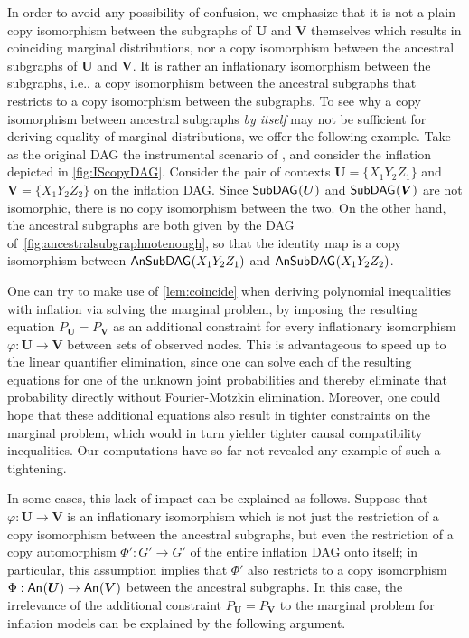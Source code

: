 \documentclass[aps,english,superscriptaddress,onecolumn,twoside,longbibliography,pra,floatfix,fleqn,nofootinbib]{revtex4-1}%
\theoremstyle{definition}
\newcounter{example}[section]
\newcommand{\An}[2][]{{\mathsf{An}_{#1}}\parenths{#2}}
\newcommand{\SmallNamedFunction}[3][]{\operatorname{\mathsf{#2}}_{#1}\parenths{#3}}
\newcommand{\subgraph}[2][]{\SmallNamedFunction[#1]{SubDAG}{#2}}
\newcommand{\ansubgraph}[2][]{\SmallNamedFunction[#1]{AnSubDAG}{#2}}
\DeclarePairedDelimiter{\parenths}{\lparen}{\rparen}
\begin{document}
In order to avoid any possibility of confusion, we emphasize that it is not a plain copy isomorphism between the subgraphs of $\bm{U}$ and $\bm{V}$ themselves which results in coinciding marginal distributions, nor a copy isomorphism between the ancestral subgraphs of $\bm{U}$ and $\bm{V}$. It is rather an inflationary isomorphism between the subgraphs, i.e., a copy isomorphism between the ancestral subgraphs that restricts to a copy isomorphism between the subgraphs. To see why a copy isomorphism between ancestral subgraphs {\em by itself} may not be sufficient for deriving equality of marginal distributions, we offer the following example. Take as the original DAG the instrumental scenario of \citet{pearl1995instrumental}, and consider the inflation depicted in \cref{fig:IScopyDAG}.  Consider the pair of contexts $\bm{U} = \{ X_1 Y_2 Z_1\}$ and $\bm{V}= \{ X_1 Y_2 Z_2\}$ on the inflation DAG. Since $\subgraph{\bm{U}}$ and $\subgraph{\bm{V}}$ are not isomorphic, there is no copy isomorphism between the two. On the other hand, 
the ancestral subgraphs are both given by the DAG of~\cref{fig:ancestralsubgraphnotenough}, so that the identity map is a copy isomorphism between $\ansubgraph{X_1 Y_2 Z_1}$ and $\ansubgraph{X_1 Y_2 Z_2}$.

One can try to make use of \cref{lem:coincide} when deriving polynomial inequalities with inflation via solving the marginal problem, by imposing the resulting equation $P_{\bm{U}} = P_{\bm{V}}$ as an additional constraint for every inflationary isomorphism $\varphi : \bm{U}\to\bm{V}$ between sets of observed nodes. This is advantageous to speed up to the linear quantifier elimination, since one can solve each of the resulting equations for one of the unknown joint probabilities and thereby eliminate that probability directly without Fourier-Motzkin elimination. Moreover, one could hope that these additional equations also result in tighter constraints on the marginal problem, which would in turn yielder tighter causal compatibility inequalities. Our computations have so far not revealed any example of such a tightening.

In some cases, this lack of impact can be explained as follows.
Suppose that $\varphi:\bm{U}\to\bm{V}$ is an inflationary isomorphism 
which is not just the restriction of a copy isomorphism between the ancestral subgraphs, but even the restriction of a copy automorphism 
$\Phi':G'\to G'$ of the entire inflation DAG onto itself; in particular, this assumption implies that $\Phi'$ also restricts to a copy isomorphism $\Phi:\An{\bm{U}}\to\An{\bm{V}}$ between the ancestral subgraphs. In this case, the irrelevance of the additional constraint $P_{\bm{U}} = P_{\bm{V}}$ to the marginal problem for inflation models can be explained by the following argument. 
\end{document}
